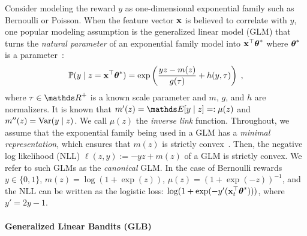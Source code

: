 Consider modeling the reward $y$ as one-dimensional exponential family such as Bernoulli or Poisson.
When the feature vector $\mathbf{x}$ is believed to correlate with $y$, one popular modeling assumption is the generalized linear model (GLM) that turns the \emph{natural parameter} of an exponential family model into $\mathbf{x}^{\top}{{\boldsymbol \theta}}^*$ where ${{\boldsymbol \theta}}^*$ is a parameter~\cite{mccullagh89generalized}:
\begin{equation}\begin{aligned}\label{eq:glm}
  \mathbb{P}(y \mid z=\mathbf{x}^{\top}{{\boldsymbol \theta}}^*) = \exp\left( { \frac{y z - m(z)}{g(\tau)} } + h(y,\tau) \right) \;,
\end{aligned}\end{equation}
where $\tau \in \dsR^+$ is a known scale parameter and $m$, $g$, and $h$ are normalizers.
It is known that $m'(z) = \expt[ y \mid z] =: \mu(z)$ and $m''(z) = {\text{\normalfont Var}}(y\mid z)$.
We call $\mu(z)$ the \emph{inverse link} function.
Throughout, we assume that the exponential family being used in a GLM has a \emph{minimal representation}, which ensures that $m(z)$ is strictly convex~\cite[Prop. 3.1]{wainwright08graphical}.
Then, the negative log likelihood (NLL) $\ell(z,y) := -yz + m(z)$ of a GLM is strictly convex.
We refer to such GLMs as the \emph{canonical} GLM.
In the case of Bernoulli rewards $y \in \{0,1\}$, $m(z) = \log(1+\exp(z))$, $\mu(z) = (1+\exp(-z))^{-1}$, and the NLL can be written as the logistic loss: $\log(1 + \exp(-y'(\mathbf{x}_t^{\top}{{\boldsymbol \theta}}^*))) $, where $y' = 2y - 1$.

\vspace{-4pt}
\paragraph{Generalized Linear Bandits (GLB)}

